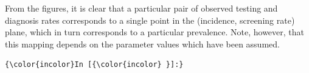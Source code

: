 \documentclass{article}
\begin{document}
    From the figures, it is clear that a particular pair of observed testing
and diagnosis rates corresponds to a single point in the (incidence,
screening rate) plane, which in turn corresponds to a particular
prevalence. Note, however, that this mapping depends on the parameter
values which have been assumed.

    \begin{footnotesize}
        \begin{Verbatim}[commandchars=\\\{\}]
{\color{incolor}In [{\color{incolor} }]:} 
\end{Verbatim}
    \end{footnotesize}


    
    
    
    
\end{document}
